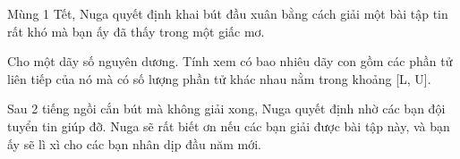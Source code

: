 Mùng 1 Tết, Nuga quyết định khai bút đầu xuân bằng cách giải một bài tập tin rất khó mà bạn ấy đã thấy trong một giấc mơ.  

   Cho một dãy số nguyên dương. Tính xem có bao nhiêu dãy con gồm các phần tử liên tiếp của nó mà có số lượng phần tử khác nhau nằm trong khoảng [L, U].  

   Sau 2 tiếng ngồi cắn bút mà không giải xong, Nuga quyết định nhờ các bạn đội tuyển tin giúp đỡ. Nuga sẽ rất biết ơn nếu các bạn giải được bài tập này, và bạn ấy sẽ lì xì cho các bạn nhân dịp đầu năm mới.
